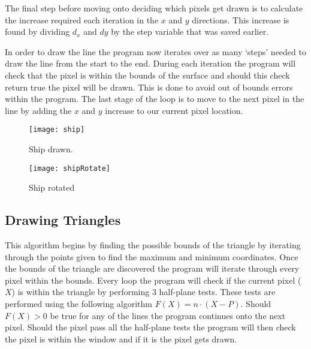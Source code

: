 \documentclass[
	letterpaper, %
	10pt, %
]{CSUniSchoolLabReport}
\begin{document}
\begin{flushleft}
	The final step before moving onto deciding which pixels get drawn is to calculate
	the increase required each iteration in the \(x\) and \(y\) directions.
	This increase is found by dividing \(d_x\) and \(dy\) by the step variable that was
	saved earlier. 
\end{flushleft}

\begin{flushleft}
	In order to draw the line the program now iterates over as many `steps'
	needed to draw the line from the start to the end. During each iteration
	the program will check that the pixel is within the bounds of the surface
	and should this check return true the pixel will be drawn. This is done to 
	avoid out of bounds errors within the program. The last stage of the loop is 
	to move to the next pixel in the line by adding the \(x\) and \(y\) increase 
	to our current pixel location.
\end{flushleft}



\begin{figure}[H]
	\centering
	\begin{minipage}[b]{0.4\textwidth}
		\texttt{[image: ship]}
		\caption{Ship drawn.}
	\end{minipage}
	\hfill
	\begin{minipage}[b]{0.4\textwidth}
		\texttt{[image: shipRotate]}
		\caption{Ship rotated}
  	\end{minipage}
\end{figure}

\subsection{Drawing Triangles}
\begin{flushleft}
	This algorithm begins by finding the possible bounds of the triangle by 
	iterating through the points given to find the maximum and minimum coordinates. 
	Once the bounds of the triangle are discovered the program will iterate 
	through every pixel within the bounds. Every loop the program will check 
	if the current pixel (\(X\)) is within the triangle by performing 3 half-plane tests.
	These tests are performed using the following algorithm \(F(X)=n \cdot (X - P)\).
	Should \(F(X) > 0\) be true for any of the lines the program continues onto 
	the next pixel. Should the pixel pass all the half-plane tests the program will 
	then check the pixel is within the window and if it is the pixel gets drawn. 

\end{flushleft}
\end{document}
